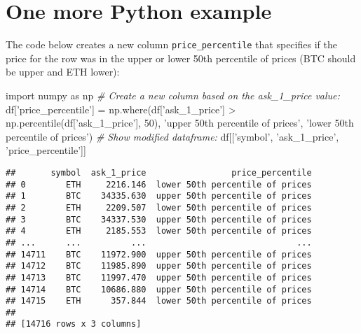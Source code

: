 \documentclass[]{tufte-handout}
\newenvironment{Shaded}{}{}
\newcommand{\CommentTok}[1]{\textcolor[rgb]{0.38,0.63,0.69}{\textit{#1}}}
\newcommand{\DecValTok}[1]{\textcolor[rgb]{0.25,0.63,0.44}{#1}}
\newcommand{\ImportTok}[1]{#1}
\newcommand{\NormalTok}[1]{#1}
\newcommand{\OperatorTok}[1]{\textcolor[rgb]{0.40,0.40,0.40}{#1}}
\newcommand{\StringTok}[1]{\textcolor[rgb]{0.25,0.44,0.63}{#1}}
\begin{document}
\hypertarget{one-more-python-example}{%
\section{One more Python example}\label{one-more-python-example}}

The code below creates a new column \texttt{price\_percentile} that
specifies if the price for the row was in the upper or lower 50th
percentile of prices (BTC should be upper and ETH lower):

\begin{Shaded}
\begin{Highlighting}[]
\ImportTok{import}\NormalTok{ numpy }\ImportTok{as}\NormalTok{ np}
\CommentTok{# Create a new column based on the ask_1_price value:}
\NormalTok{df[}\StringTok{'price_percentile'}\NormalTok{] }\OperatorTok{=}\NormalTok{ np.where(df[}\StringTok{'ask_1_price'}\NormalTok{] }\OperatorTok{>} 
\NormalTok{                                  np.percentile(df[}\StringTok{'ask_1_price'}\NormalTok{], }\DecValTok{50}\NormalTok{),}
                            \StringTok{'upper 50th percentile of prices'}\NormalTok{, }
                            \StringTok{'lower 50th percentile of prices'}\NormalTok{)}
\CommentTok{# Show modified dataframe:}
\NormalTok{df[[}\StringTok{'symbol'}\NormalTok{, }\StringTok{'ask_1_price'}\NormalTok{, }\StringTok{'price_percentile'}\NormalTok{]]}
\end{Highlighting}
\end{Shaded}

\begin{verbatim}
##       symbol  ask_1_price                 price_percentile
## 0        ETH     2216.146  lower 50th percentile of prices
## 1        BTC    34335.630  upper 50th percentile of prices
## 2        ETH     2209.507  lower 50th percentile of prices
## 3        BTC    34337.530  upper 50th percentile of prices
## 4        ETH     2185.553  lower 50th percentile of prices
## ...      ...          ...                              ...
## 14711    BTC    11972.900  upper 50th percentile of prices
## 14712    BTC    11985.890  upper 50th percentile of prices
## 14713    BTC    11997.470  upper 50th percentile of prices
## 14714    BTC    10686.880  upper 50th percentile of prices
## 14715    ETH      357.844  lower 50th percentile of prices
## 
## [14716 rows x 3 columns]
\end{verbatim}
\end{document}
